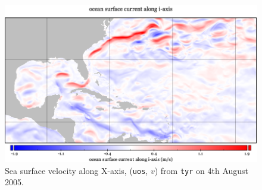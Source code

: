 \begin{figure}
\includegraphics[width=\linewidth]{images/example-images/uos.png}
\caption{Sea surface velocity along X-axis, (\texttt{uos}, $v$) from \texttt{tyr}
on 4th August 2005. }
\label{fig:uos}
\end{figure}
